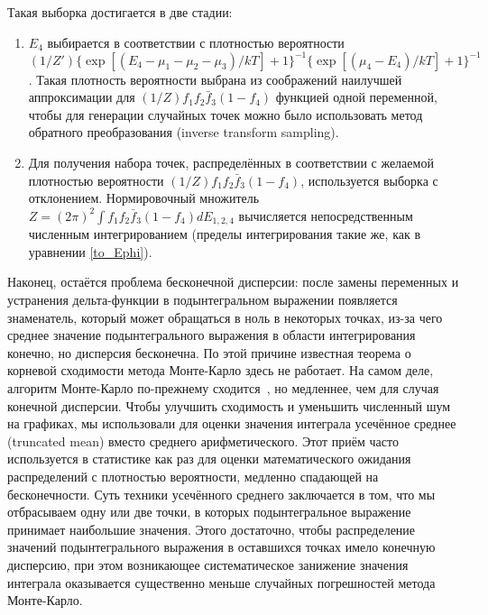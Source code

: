 Такая выборка достигается в две стадии:
\begin{enumerate}
\item $E_4$ выбирается в соответствии с плотностью вероятности $(1/Z')\{\exp[(E_4-\mu_1-\mu_2-\mu_3)/kT]+1\}^{-1}\{\exp[(\mu_4-E_4)/kT]+1\}^{-1}$. Такая плотность вероятности выбрана из соображений наилучшей аппроксимации для $(1/Z) f_1 f_2 \bar{f}_3 (1-f_4)$ функцией одной переменной, чтобы для генерации случайных точек можно было использовать метод обратного преобразования (inverse transform sampling).\\
\item Для получения набора точек, распределённых в соответствии с желаемой плотностью вероятности $(1/Z) f_1 f_2 \bar{f}_3 (1-f_4)$, используется выборка с отклонением. Нормировочный множитель $Z = (2\pi)^2\int f_1 f_2 \bar{f}_3 (1-f_4) dE_{1,2,4}$ вычисляется непосредственным численным интегрированием (пределы интегрирования такие же, как в уравнении \eqref{to_Ephi}).\\
\end{enumerate}

Наконец, остаётся проблема бесконечной дисперсии: после замены переменных и устранения дельта-функции в подынтегральном выражении появляется знаменатель, который может обращаться в ноль в некоторых точках, из-за чего среднее значение подынтегрального выражения в области интегрирования конечно, но дисперсия бесконечна. По этой причине известная теорема о корневой сходимости метода Монте-Карло здесь не работает. На самом деле, алгоритм Монте-Карло по-прежнему сходится~\cite{Monte_Carlo_infinite_variance}, но медленнее, чем для случая конечной дисперсии. Чтобы улучшить сходимость и уменьшить численный шум на графиках, мы использовали для оценки значения интеграла усечённое среднее (truncated mean) вместо среднего арифметического. Этот приём часто используется в статистике как раз для оценки математического ожидания распределений с плотностью вероятности, медленно спадающей на бесконечности. Суть техники усечённого среднего заключается в том, что мы отбрасываем одну или две точки, в которых подынтегральное выражение принимает наибольшие значения. Этого достаточно, чтобы распределение значений подынтегрального выражения в оставшихся точках имело конечную дисперсию, при этом возникающее систематическое занижение значения интеграла оказывается существенно меньше случайных погрешностей метода Монте-Карло.

